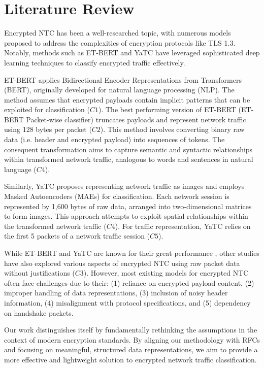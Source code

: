 \section{Literature Review}
Encrypted NTC has been a well-researched topic, with numerous models proposed to address the complexities of encryption protocols like TLS 1.3. Notably, methods such as ET-BERT \cite{foundation_et_bert} and YaTC \cite{foundation_yatc} have leveraged sophisticated deep learning techniques to classify encrypted traffic effectively.

ET-BERT \cite{foundation_et_bert} applies Bidirectional Encoder Representations from Transformers (BERT), originally developed for natural language processing (NLP). The method assumes that encrypted payloads contain implicit patterns that can be exploited for classification ($C1$). The best performing version of ET-BERT (ET-BERT Packet-wise classifier) truncates payloads and represent network traffic using 128 bytes per packet ($C2$). This method involves converting binary raw data (i.e. header and encrypted payload) into sequences of tokens. The consequent transformation aims to capture semantic and syntactic relationships within transformed network traffic, analogous to words and sentences in natural language ($C4$).

Similarly, YaTC \cite{foundation_yatc} proposes representing network traffic as images and employs Masked Autoencoders (MAEs) for classification. Each network session is represented by 1,600 bytes of raw data, arranged into two-dimensional matrices to form images. This approach attempts to exploit spatial relationships within the transformed network traffic ($C4$). For traffic representation, YaTC relies on the first 5 packets of a network traffic session ($C5$).

While ET-BERT and YaTC are known for their great performance \cite{netbench, yatc_etbert_best_1}, other studies have also explored various aspects of encrypted NTC using raw packet data without justifications \cite{tfe-gnn, foundation_flow_mae} ($C3$). However, most existing models for encrypted NTC often face challenges due to their: (1) reliance on encrypted payload content, (2) improper handling of data representations, (3) inclusion of noisy header information, (4) misalignment with protocol specifications, and (5) dependency on handshake packets. 

Our work distinguishes itself by fundamentally rethinking the assumptions in the context of modern encryption standards. By aligning our methodology with RFCs and focusing on meaningful, structured data representations, we aim to provide a more effective and lightweight solution to encrypted network traffic classification.








